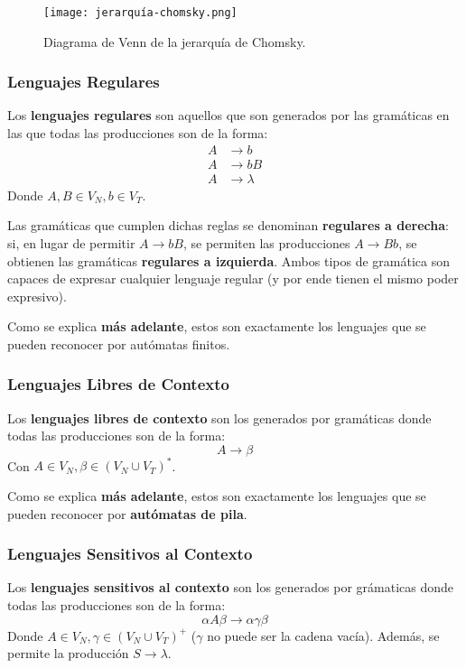 \begin{figure}[H]
    \centering
    \texttt{[image: jerarquía-chomsky.png]}
    \caption*{Diagrama de Venn de la jerarquía de Chomsky.}
\end{figure}

\subsubsection{Lenguajes Regulares}
\label{lenguaje-regular}

Los \textbf{lenguajes regulares} son aquellos que son generados por las gramáticas en las que todas las producciones son de la forma:
$$
\begin{aligned}
    A & \to b \\
    A & \to b B \\
    A & \to \lambda
\end{aligned}
$$
Donde $A, B \in V_N, b \in V_T$.

Las gramáticas que cumplen dichas reglas se denominan \textbf{regulares a derecha}: si, en lugar de permitir $A \to b B$, se permiten las producciones $A \to B b$, se obtienen las gramáticas \textbf{regulares a izquierda}. Ambos tipos de gramática son capaces de expresar cualquier lenguaje regular (y por ende tienen el mismo poder expresivo).

Como se explica \textbf{más adelante}, estos son exactamente los lenguajes que se pueden reconocer por autómatas finitos.

\subsubsection{Lenguajes Libres de Contexto}

Los \textbf{lenguajes libres de contexto} son los generados por gramáticas donde todas las producciones son de la forma:
$$A \to \beta$$
Con $A \in V_N, \beta \in (V_N \cup V_T)^*$.

Como se explica \textbf{más adelante}, estos son exactamente los lenguajes que se pueden reconocer por \textbf{autómatas de pila}.

\subsubsection{Lenguajes Sensitivos al Contexto}

Los \textbf{lenguajes sensitivos al contexto} son los generados por grámaticas donde todas las producciones son de la forma:
$$\alpha A \beta \to \alpha \gamma \beta$$
Donde $A \in V_N, \gamma \in (V_N \cup V_T)^+$ ($\gamma$ no puede ser la cadena vacía). Además, se permite la producción $S \to \lambda$.

